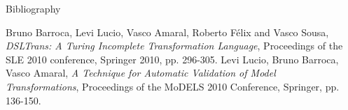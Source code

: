 \documentclass[final,hyperref={pdfpagelabels=false}]{beamer}
\begin{document}
\begin{frame}{}
\begin{columns}[t]
\begin{column}{.485\linewidth}
    \end{column}
    \begin{column}{.485\linewidth}
    	\begin{block}{Bibliography}
    	   \begin{thebibliography}{10} 
    	    Bruno Barroca, Levi Lucio, Vasco Amaral, Roberto
    	   F{\'e}lix and Vasco Sousa, {\em DSLTrans: A Turing Incomplete
    	   Transformation Language}, Proceedings of the SLE 2010 conference,
    	   Springer 2010, pp. 296-305.
    	    Levi Lucio, Bruno Barroca, Vasco Amaral, {\em A
    	   Technique for Automatic Validation of Model Transformations},
    	   Proceedings of the MoDELS 2010 Conference, Springer, pp. 136-150.
		\end{thebibliography}	   
    	\end{block}        
    \end{column}    
   \end{columns}

  \end{frame}
\end{document}
